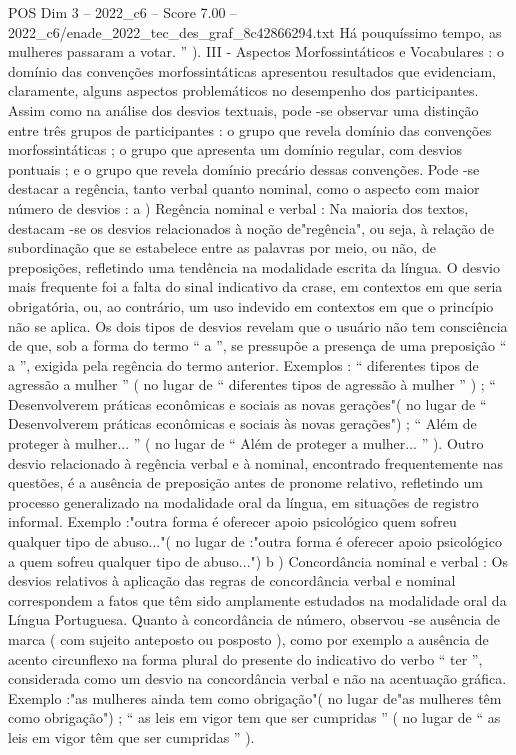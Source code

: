 \begin{textsample}{POS Dim 3 – 2022\_c6 – Score 7.00 – 2022\_c6/enade\_2022\_tec\_des\_graf\_8c42866294.txt}
Há pouquíssimo tempo, as mulheres passaram a votar. ” ).
III - Aspectos Morfossintáticos e Vocabulares : o domínio das convenções morfossintáticas apresentou resultados que evidenciam, claramente, alguns aspectos problemáticos no desempenho dos participantes.
Assim como na análise dos desvios textuais, pode -se observar uma distinção entre três grupos de participantes : o grupo que revela domínio das convenções morfossintáticas ; o grupo que apresenta um domínio regular, com desvios pontuais ; e o grupo que revela domínio precário dessas convenções.
Pode -se destacar a regência, tanto verbal quanto nominal, como o aspecto com maior número de desvios : a ) Regência nominal e verbal : Na maioria dos textos, destacam -se os desvios relacionados à noção de"regência", ou seja, à relação de subordinação que se estabelece entre as palavras por meio, ou não, de preposições, refletindo uma tendência na modalidade escrita da língua.
O desvio mais frequente foi a falta do sinal indicativo da crase, em contextos em que seria obrigatória, ou, ao contrário, um uso indevido em contextos em que o princípio não se aplica.
Os dois tipos de desvios revelam que o usuário não tem consciência de que, sob a forma do termo “ a ”, se pressupõe a presença de uma preposição “ a ”, exigida pela regência do termo anterior.
Exemplos : “ diferentes tipos de agressão a mulher ” ( no lugar de “ diferentes tipos de agressão à mulher ” ) ; “ Desenvolverem práticas econômicas e sociais as novas gerações"( no lugar de “ Desenvolverem práticas econômicas e sociais às novas gerações") ; “ Além de proteger à mulher... ” ( no lugar de “ Além de proteger a mulher... ” ).
Outro desvio relacionado à regência verbal e à nominal, encontrado frequentemente nas questões, é a ausência de preposição antes de pronome relativo, refletindo um processo generalizado na modalidade oral da língua, em situações de registro informal.
Exemplo :"outra forma é oferecer apoio psicológico quem sofreu qualquer tipo de abuso..."( no lugar de :"outra forma é oferecer apoio psicológico a quem sofreu qualquer tipo de abuso...") b ) Concordância nominal e verbal : Os desvios relativos à aplicação das regras de concordância verbal e nominal correspondem a fatos que têm sido amplamente estudados na modalidade oral da Língua Portuguesa.
Quanto à concordância de número, observou -se ausência de marca ( com sujeito anteposto ou posposto ), como por exemplo a ausência de acento circunflexo na forma plural do presente do indicativo do verbo “ ter ”, considerada como um desvio na concordância verbal e não na acentuação gráfica.
Exemplo :"as mulheres ainda tem como obrigação"( no lugar de"as mulheres têm como obrigação") ; “ as leis em vigor tem que ser cumpridas ” ( no lugar de “ as leis em vigor têm que ser cumpridas ” ).

\end{textsample}
